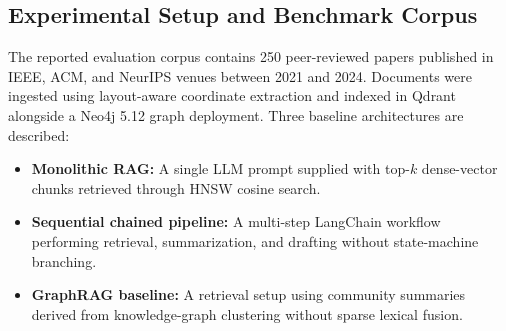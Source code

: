 \documentclass[conference]{IEEEtran}
\begin{document}
\subsection{Experimental Setup and Benchmark Corpus}
The reported evaluation corpus contains 250 peer-reviewed papers published in IEEE, ACM, and NeurIPS venues between 2021 and 2024. Documents were ingested using layout-aware coordinate extraction and indexed in Qdrant alongside a Neo4j 5.12 graph deployment.
Three baseline architectures are described:
\begin{itemize}
\item \textbf{Monolithic RAG:} A single LLM prompt supplied with top-$k$ dense-vector chunks retrieved through HNSW cosine search.
\item \textbf{Sequential chained pipeline:} A multi-step LangChain workflow performing retrieval, summarization, and drafting without state-machine branching.
\item \textbf{GraphRAG baseline:} A retrieval setup using community summaries derived from knowledge-graph clustering without sparse lexical fusion.
\end{itemize}
\end{document}
